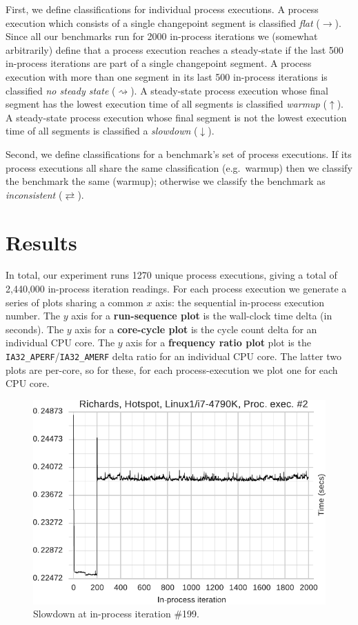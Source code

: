 \documentclass[preprint,numbers,10pt]{sigplanconf}
\newcommand{\flatc}{$\rightarrow$}
\newcommand{\nosteadystate}{$\rightsquigarrow$}
\newcommand{\warmup}{$\uparrow$}
\newcommand{\slowdown}{$\downarrow$}
\newcommand{\inconsistent}{$\rightleftarrows$}
\begin{document}
First, we define classifications for individual process executions. A process
execution which consists of a single changepoint segment is classified
\emph{flat} (\flatc). Since all our benchmarks run for 2000 in-process
iterations we (somewhat arbitrarily) define that a process execution reaches a
steady-state if the last 500 in-process iterations are part of a single
changepoint segment. A process execution with more than one segment in its last
500 in-process iterations is classified \emph{no steady state}
(\nosteadystate). A steady-state process execution whose final segment has
the lowest execution time of all segments is classified \emph{warmup}
(\warmup). A steady-state process execution whose final segment is not the
lowest execution time of all segments is classified a \emph{slowdown}
(\slowdown).

Second, we define classifications for a benchmark's set of process executions.
If its process executions all share the same classification (e.g.~warmup) then
we classify the benchmark the same (warmup); otherwise we classify the benchmark as
\emph{inconsistent} (\inconsistent).


\section{Results}
\label{sec:Results}

%

In total, our experiment runs  1270 unique process executions, giving a total
of 2,440,000 in-process iteration readings.
For each process execution we generate a series of plots sharing a common $x$
axis: the sequential in-process execution number. The $y$ axis for a
\textbf{run-sequence plot} is the wall-clock time delta (in seconds). The $y$
axis for a \textbf{core-cycle plot} is the cycle count delta for an individual
CPU core. The $y$ axis for a \textbf{frequency ratio plot} plot is the
\texttt{IA32\_APERF}/\texttt{IA32\_AMERF} delta ratio for an individual CPU
core. The latter two plots are per-core, so for these, for each
process-execution we plot one for each CPU core.

\begin{figure}[tbp]
\centering
\includegraphics[width=.45\textwidth]{examples/new_slowdown.pdf}
\caption{Slowdown at in-process iteration \#199.}
\label{fig:examples:slowdown1}
\end{figure}
\end{document}
